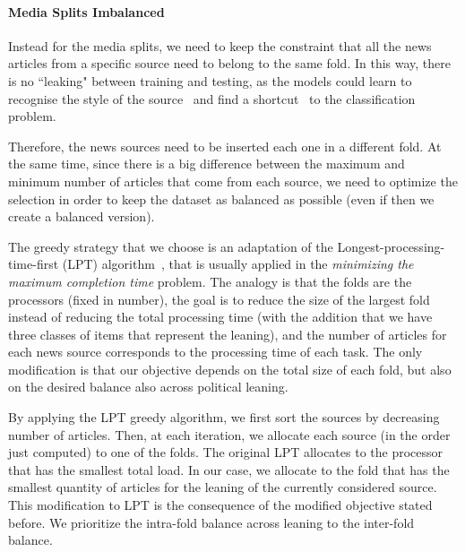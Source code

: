 \paragraph{Media Splits Imbalanced}

Instead for the media splits, we need to keep the constraint that all the news articles from a specific source need to belong to the same fold. In this way, there is no ``leaking" between training and testing, as the models could learn to recognise the style of the source~\citep{baly2020we} and find a shortcut~\citep{geirhos2020shortcut} to the classification problem.

Therefore, the news sources need to be inserted each one in a different fold. At the same time, since there is a big difference between the maximum and minimum number of articles that come from each source, we need to optimize the selection in order to keep the dataset as balanced as possible (even if then we create a balanced version).


The greedy strategy that we choose is an adaptation of the Longest-processing-time-first (LPT) algorithm~\citep{graham1969bounds}, that is usually applied in the \emph{minimizing the maximum completion time} problem.
The analogy is that the folds are the processors (fixed in number), the goal is to reduce the size of the largest fold instead of reducing the total processing time (with the addition that we have three classes of items that represent the leaning), and the number of articles for each news source corresponds to the processing time of each task.
The only modification is that our objective depends on the total size of each fold, but also on the desired balance also across political leaning.

By applying the LPT greedy algorithm, we first sort the sources by decreasing number of articles. Then, at each iteration, we allocate each source (in the order just computed) to one of the folds. The original LPT allocates to the processor that has the smallest total load. In our case, we allocate to the fold that has the smallest quantity of articles for the leaning of the currently considered source.
This modification to LPT is the consequence of the modified objective stated before.
We prioritize the intra-fold balance across leaning to the inter-fold balance.

